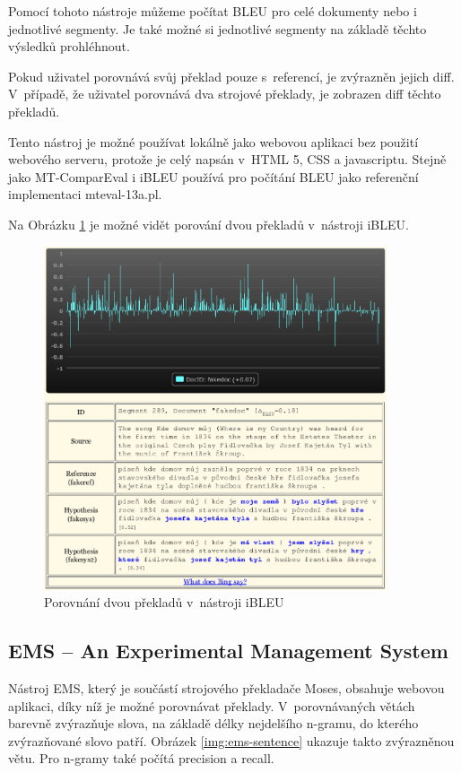 Pomocí tohoto nástroje můžeme počítat BLEU pro celé dokumenty nebo i jednotlivé segmenty.
Je také možné si jednotlivé segmenty na základě těchto výsledků prohléhnout.

Pokud uživatel porovnává svůj překlad pouze s~referencí,
  je zvýrazněn jejich diff.
V~případě, že uživatel porovnává dva strojové překlady,
  je zobrazen diff těchto překladů.

Tento nástroj je možné používat lokálně jako webovou aplikaci bez použití webového serveru,
  protože je celý napsán v~HTML 5, CSS a javascriptu.
Stejně jako MT-ComparEval i iBLEU používá pro počítání BLEU jako referenční implementaci mteval-13a.pl.

Na Obrázku \ref{img:ibleu} je možné vidět porování dvou překladů v~nástroji iBLEU.
\begin{figure}
  \center
  \includegraphics[width=0.9\textwidth]{img/ibleu.eps}
  \caption{Porovnání dvou překladů v~nástroji iBLEU}
  \label{img:ibleu}
\end{figure}


\subsection{EMS -- An Experimental Management System}
Nástroj EMS,
  který je součástí strojového překladače Moses,
  obsahuje webovou aplikaci,
  díky níž je možné porovnávat překlady.
V~porovnávaných větách barevně zvýrazňuje slova,
  na základě délky nejdelšího \mbox{n-gramu},
  do kterého zvýrazňované slovo patří.
Obrázek \ref{img:ems-sentence} ukazuje takto zvýrazněnou větu.
Pro \mbox{n-gramy} také počítá precision a recall.

